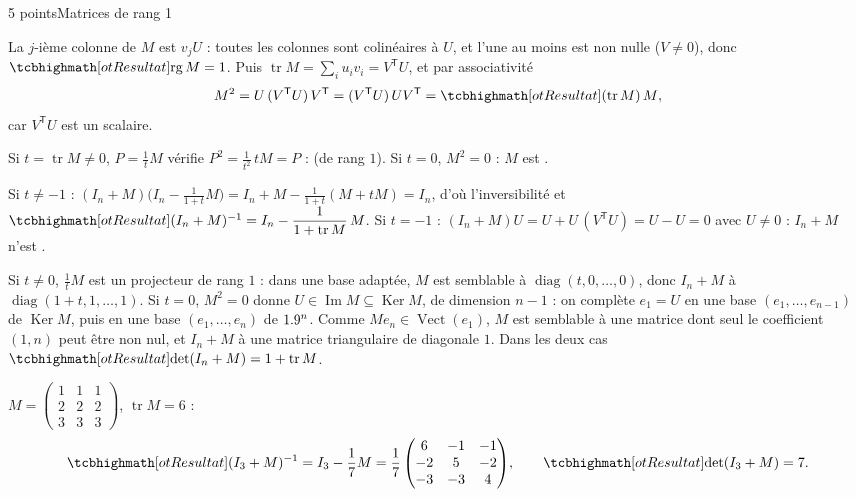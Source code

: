 \begin{corrigeEval}{5 points}{Matrices de rang 1}
\begin{questions}
  \item La $j$-ième colonne de $M$ est $v_jU$ : toutes les colonnes sont
    colinéaires à $U$, et l'une au moins est non nulle ($V\neq0$), donc
    $\res{\operatorname{rg}M=1}$. Puis
    $\operatorname{tr}M=\sum_iu_iv_i=V^{\mathsf{T}}U$, et par associativité
    \[M^{2}=U\,(V^{\mathsf{T}}U)\,V^{\mathsf{T}}=(V^{\mathsf{T}}U)\,UV^{\mathsf{T}}=\res{(\operatorname{tr}M)\,M},\]
    car $V^{\mathsf{T}}U$ est un scalaire. 
  \item Si $t=\operatorname{tr}M\neq0$, $P=\frac1tM$ vérifie
    $P^{2}=\frac{1}{t^{2}}\,tM=P$ :  (de rang $1$). Si
    $t=0$, $M^{2}=0$ : $M$ est . \pts{1 pt}
  \item Si $t\neq-1$ :
    $(I_n+M)\bigl(I_n-\frac{1}{1+t}M\bigr)=I_n+M-\frac{1}{1+t}(M+tM)=I_n$,
    d'où l'inversibilité et
    $\res{(I_n+M)^{-1}=I_n-\dfrac{1}{1+\operatorname{tr}M}\,M}$. Si $t=-1$ :
    $(I_n+M)U=U+U\,(V^{\mathsf{T}}U)=U-U=0$ avec $U\neq0$ : $I_n+M$ n'est
    . \pts{1 pt}
  \item Si $t\neq0$, $\frac1tM$ est un projecteur de rang $1$ : dans une base
    adaptée, $M$ est semblable à $\operatorname{diag}(t,0,\dots,0)$, donc
    $I_n+M$ à $\operatorname{diag}(1+t,1,\dots,1)$. Si $t=0$, $M^{2}=0$ donne
    $U\in\operatorname{Im}M\subseteq\operatorname{Ker}M$, de dimension $n-1$ :
    on complète $e_1=U$ en une base $(e_1,\dots,e_{n-1})$ de
    $\operatorname{Ker}M$, puis en une base $(e_1,\dots,e_n)$ de $1.9^{n}$.
    Comme $Me_n\in\operatorname{Vect}(e_1)$, $M$ est semblable à une matrice
    dont seul le coefficient $(1,n)$ peut être non nul, et $I_n+M$ à une
    matrice triangulaire de diagonale $1$. Dans les deux cas
    $\res{\det(I_n+M)=1+\operatorname{tr}M}$. \pts{1 pt}
  \item $M=\begin{pmatrix}1&1&1\\2&2&2\\3&3&3\end{pmatrix}$, $\operatorname{tr}M=6$ :
    \[\res{(I_3+M)^{-1}=I_3-\frac17M=\frac17\begin{pmatrix}6&-1&-1\\-2&5&-2\\-3&-3&4\end{pmatrix}},
      \qquad\res{\det(I_3+M)=7}.\]
\end{questions}
\end{corrigeEval}

